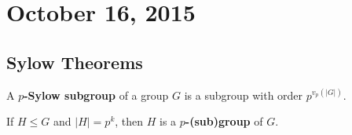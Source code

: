 \section{October 16, 2015}

\subsection{Sylow Theorems}

\begin{df}
A \textbf{$p$-Sylow subgroup} of a group $G$ is a subgroup with order
$p^{v_p(\lvert G \rvert)}$.
\end{df}

\begin{df}
If $H \leq G$ and $\lvert H \rvert = p^k$, then $H$ is a
\textbf{$p$-(sub)group} of $G$.
\end{df}
